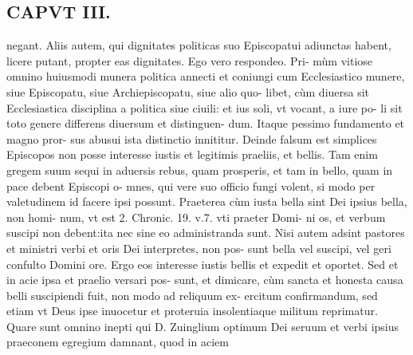 \documentclass{article}
\begin{document}
\begin{pages}
\section*{CAPVT  III. }
\marginpar{[ p.187 ]}\pstart negant. Aliis autem, qui dignitates politicas suo Episcopatui adiunctas habent, licere putant, propter eas dignitates. Ego vero respondeo. Pri- mùm vitiose omnino huiusmodi munera politica annecti et coniungi cum Ecclesiastico munere, siue Episcopatu, siue Archiepiscopatu, siue alio quo- libet, cùm diuersa sit Ecclesiastica disciplina a politica siue ciuili: et ius soli, vt vocant, a iure po- li sit toto genere differens diuersum et distinguen- dum. Itaque pessimo fundamento et magno pror- sus abusui ista distinctio innititur. Deinde falsum est simplices Episcopos non posse interesse iustis et legitimis praeliis, et bellis. Tam enim gregem suum sequi in aduersis rebus, quam prosperis, et tam in bello, quam in pace debent Episcopi o- mnes, qui vere suo officio fungi volent, si modo per valetudinem id facere ipsi possunt. Praeterea cùm iusta bella sint Dei ipsius bella, non homi- num, vt est 2. Chronic. 19. v.7. vti praeter Domi- ni os, et verbum suscipi non debent:ita nec sine eo administranda sunt. Nisi autem adsint pastores et ministri verbi et oris Dei interpretes, non pos- sunt bella vel suscipi, vel geri confulto Domini ore. Ergo eos interesse iustis bellis et expedit et oportet. Sed et in acie ipsa et praelio versari pos- sunt, et dimicare, cùm sancta et honesta causa belli suscipiendi fuit, non modo ad reliquum ex- ercitum confirmandum, sed etiam vt Deus ipse inuocetur et proteruia insolentiaque militum reprimatur. Quare sunt omnino inepti qui D. Zuinglium optimum Dei seruum et verbi ipsius praeconem egregium damnant, quod in aciem  \pend

\end{pages}
\end{document}
